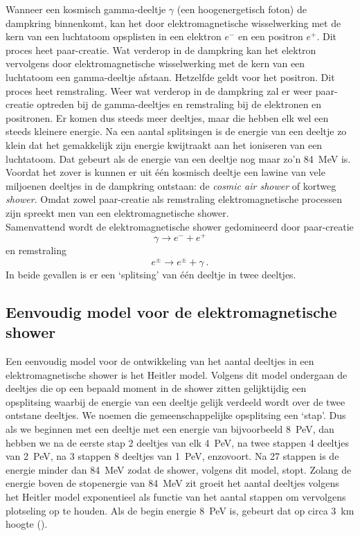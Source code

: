 Wanneer een kosmisch gamma-deeltje $\gamma$ (een hoogenergetisch foton)
de dampkring binnenkomt, kan het door elektromagnetische wisselwerking
met de kern van een luchtatoom opsplisten in een elektron $e^-$ en een
positron $e^+$. Dit proces heet paar-creatie. Wat verderop in de
dampkring kan het elektron vervolgens door elektromagnetische
wisselwerking met de kern van een luchtatoom een gamma-deeltje afstaan.
Hetzelfde geldt voor het positron. Dit proces heet remstraling. Weer wat
verderop in de dampkring zal er weer paar-creatie optreden bij de
gamma-deeltjes en remstraling bij de elektronen en positronen. Er komen
dus steeds meer deeltjes, maar die hebben elk wel een steeds kleinere
energie. Na een aantal splitsingen is de energie van een deeltje zo
klein dat het gemakkelijk zijn energie kwijtraakt aan het ioniseren van
een luchtatoom. Dat gebeurt als de energie van een deeltje nog maar zo'n
\SI{84}{\mega\electronvolt} is. Voordat het zover is kunnen er uit één
kosmisch deeltje een lawine van vele miljoenen deeltjes in de dampkring
ontstaan: de \emph{cosmic air shower} of kortweg \emph{shower}. Omdat
zowel paar-creatie als remstraling elektromagnetische processen zijn
spreekt men van een elektromagnetische shower. \\

Samenvattend wordt de elektromagnetische shower gedomineerd door paar-creatie
\begin{equation}
    \gamma \rightarrow e^- + e^+ \nonumber
\end{equation}
en remstraling
\begin{equation}
    e^\pm \rightarrow e^\pm + \gamma \ . \nonumber
\end{equation}
In beide gevallen is er een `splitsing' van één deeltje in twee deeltjes.


\subsection{Eenvoudig model voor de elektromagnetische shower}

Een eenvoudig model voor de ontwikkeling van het aantal deeltjes in een
elektromagnetische shower is het Heitler model. Volgens dit model
ondergaan de deeltjes die op een bepaald moment in de shower zitten
gelijktijdig een opsplitsing waarbij de energie van een deeltje gelijk
verdeeld wordt over de twee ontstane deeltjes. We noemen die
gemeenschappelijke opsplitsing een `stap'. Dus als we beginnen met een
deeltje met een energie van bijvoorbeeld \SI{8}{\peta\electronvolt}, dan
hebben we na de eerste stap 2 deeltjes van elk
\SI{4}{\peta\electronvolt}, na twee stappen 4 deeltjes van
\SI{2}{\peta\electronvolt}, na 3 stappen 8 deeltjes van
\SI{1}{\peta\electronvolt}, enzovoort. Na 27 stappen is de energie
minder dan \SI{84}{\mega\electronvolt} zodat de shower, volgens dit
model, stopt. Zolang de energie boven de stopenergie van
\SI{84}{\mega\electronvolt} zit groeit het aantal deeltjes volgens het
Heitler model exponentieel als functie van het aantal stappen om
vervolgens plotseling op te houden. Als de begin energie
\SI{8}{\peta\electronvolt} is, gebeurt dat op circa \SI{3}{\km} hoogte
().

